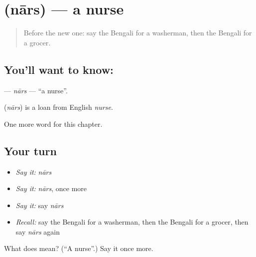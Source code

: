 \section[\texorpdfstring{\bn{নার্স} (nārs)}{নার্স (nārs)}]{ (nārs) — a nurse}

\label{lesson:BN-C126-nars}



\begin{quote}
Before the new one: say the Bengali for a washerman, then the Bengali for a grocer.
\end{quote}

\subsection*{You'll want to know: }
\textbf{} — \emph{nārs} — \textquotedblleft{}a nurse\textquotedblright{}.

\begin{cousinweb}
\textbf{} (\emph{nārs}) is a loan from English \emph{nurse}.
\end{cousinweb}

\begin{grammarlens}[title={What you've built}]
One more word for this chapter.
\end{grammarlens}

\subsection*{Your turn}
\begin{itemize}
\raggedright
  \item \emph{Say it:} \emph{nārs}
  \item \emph{Say it:} \emph{nārs}, once more
  \item \emph{Say it:} say \emph{nārs}
  \item \emph{Recall:} say the Bengali for a washerman, then the Bengali for a grocer, then say \emph{nārs} again
\end{itemize}

\begin{tcolorbox}[breakable,colback=teal!4,colframe=teal!35!black,title={Before you move on}]
What does  mean? (\textquotedblleft{}A nurse\textquotedblright{}.) Say it once more.
\end{tcolorbox}
